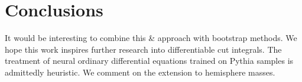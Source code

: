 \section{Conclusions}\label{sec:conclusions}

It would be interesting to combine this & approach with bootstrap methods.
We hope this work inspires further research into differentiable cut
integrals. The treatment of neural ordinary differential equations
trained on Pythia samples is admittedly heuristic. We comment on the
extension to hemisphere masses.

